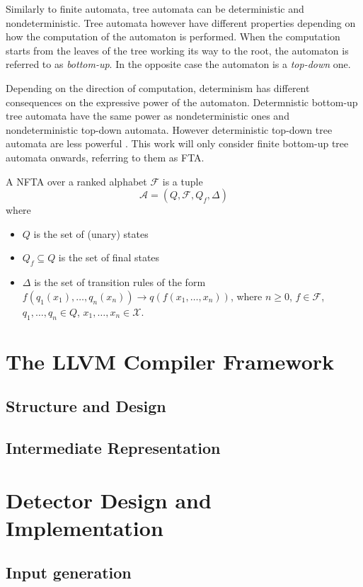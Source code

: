 Similarly to finite automata, tree automata can be deterministic and nondeterministic. Tree automata however have different properties depending on how the computation of the automaton is performed. When the computation starts from the leaves of the tree working its way to the root, the automaton is referred to as \emph{bottom-up}. In the opposite case the automaton is a \emph{top-down} one.

Depending on the direction of computation, determinism has different consequences on the expressive power of the automaton. Determnistic bottom-up tree automata have the same power as nondeterministic ones and nondeterministic top-down automata. However deterministic top-down tree automata are less powerful \cite{tata07}. This work will only consider finite bottom-up tree automata onwards, referring to them as FTA.

\begin{defn}
A NFTA over a ranked alphabet $\mathcal{F}$ is a tuple $$\mathcal{A} = (Q, \mathcal{F}, Q_f, \Delta)$$ where
\begin{itemize}
    \item $Q$ is the set of (unary) states
    \item $Q_f \subseteq Q$ is the set of final states
    \item $\Delta$ is the set of transition rules of the form $f(q_1(x_1), \dots, q_n(x_n)) \rightarrow q(f(x_1, \dots, x_n))$, where $n \geq 0$, $f \in \mathcal{F}$, $q_1, \dots, q_n \in Q$, $x_1, \dots, x_n \in \mathcal{X}$.
\end{itemize}
\end{defn}

\chapter{The LLVM Compiler Framework}
\label{ch_llvm}
    \section{Structure and Design}
    \section{Intermediate Representation}
\chapter{Detector Design and Implementation}
\label{ch_detector}
    \section{Input generation}
